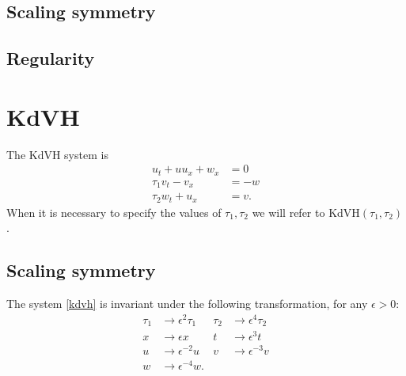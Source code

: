 \documentclass{article}
\theoremstyle{plain}
\theoremstyle{definition}
\numberwithin{theorem}{section}
\begin{document}
\subsection{Scaling symmetry}

\subsection{Regularity}

\section{KdVH}

The KdVH system is
\begin{subequations} \label{kdvh}
\begin{align}
    u_t + uu_x + w_x & = 0 \\
    \tau_1 v_t - v_x & = -w \\
    \tau_2 w_t + u_x & = v.
\end{align}
\end{subequations}
When it is necessary to specify the values of $\tau_1, \tau_2$ we will
refer to KdVH$(\tau_1,\tau_2)$.

\subsection{Scaling symmetry}
The system \eqref{kdvh} is invariant under the following
transformation, for any $\epsilon>0$:
\begin{subequations}
\label{eq:scaling}
\begin{align}
    \tau_1 & \to \epsilon^2 \tau_1 & \tau_2 & \to \epsilon^4 \tau_2 \\
    x & \to \epsilon x & t & \to \epsilon^3 t \\
    u & \to \epsilon^{-2} u & v & \to \epsilon^{-3} v \\
    w & \to \epsilon^{-4} w.
\end{align}
\end{subequations}
\end{document}
